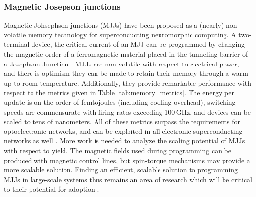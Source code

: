 \documentclass[twocolumn]{article}
\begin{document}
\subsubsection{Magnetic Josepson junctions}
Magnetic Johsephson junctions (MJJs) have been proposed as a (nearly) non-volatile memory technology for superconducting neuromorphic computing. A two-terminal device, the critical current of an MJJ can be programmed by changing the magnetic order of a ferromagnetic material placed in the tunneling barrier of a Josephson Junction \cite{schneider2018ultralow}. MJJs are non-volatile with respect to electrical power, and there is optimism they can be made to retain their memory through a warm-up to room-temperature. Additionally, they provide remarkable performance with respect to the metrics given in Table \ref{tab:memory_metrics}. The energy per update is on the order of femtojoules (including cooling overhead), switching speeds are commensurate with firing rates exceeding 100\,GHz, and devices can be scaled to tens of nanometers. All of these metrics surpass the requirements for optoelectronic networks, and can be exploited in all-electronic superconducting networks as well \cite{schneider2018tutorial}. More work is needed to analyze the scaling potential of MJJs with respect to yield. The magnetic fields used during programming can be produced with magnetic control lines, but spin-torque mechanisms may provide a more scalable solution. Finding an efficient, scalable solution to programming MJJs in large-scale systems thus remains an area of research which will be critical to their potential for adoption \cite{schneider2018ultralow}.
\end{document}
